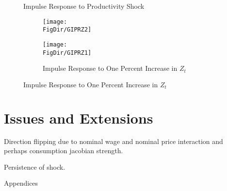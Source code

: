 \documentclass[titlepage]{\econtex}\providecommand{\texname}{BufferStockTheory}
\providecommand{\FigDir}{Figures}
\begin{document}
\begin{figure}{Impulse Response to Productivity Shock}
  \begin{subfigure}{}
    \centering\texttt{[image: \\FigDir/GIPRZ2]}
  \end{subfigure}
  \begin{subfigure}{}
    \centering\texttt{[image: \\FigDir/GIPRZ1]}
    \caption{ Impulse Response to One Percent Increase in $Z_{t}$}
  \end{subfigure}
\end{figure}



\hypertarget{Issues and Extensions}{}
\section{Issues and Extensions}


Direction flipping due to nominal wage and nominal price interaction and perhaps consumption jacobian strength.

Persistence of shock.





















\clearpage\vfill\eject

\appendix

\centerline{\LARGE Appendices}\vspace{0.2in}




\clearpage\vfill\eject

\normalsize
\end{document}
